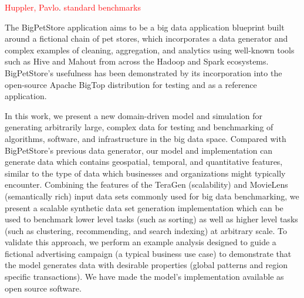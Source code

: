 \documentclass[conference]{IEEEtran}
\begin{document}
\textcolor{red}{Huppler, Pavlo}.  \textcolor{red}{standard benchmarks}

The BigPetStore application aims to be a big data application blueprint built around a fictional chain of pet stores, which incorporates a data generator and complex examples of cleaning, aggregation, and analytics using well-known tools such as Hive and Mahout \cite{Mahout} from across the Hadoop and Spark ecosystems. BigPetStore's usefulness has been demonstrated by its incorporation into the open-source Apache BigTop distribution \cite{BigTop} for testing and as a reference application.  

In this work, we present a new domain-driven model and simulation for generating arbitrarily large, complex data for testing and benchmarking of algorithms, software, and infrastructure in the big data space. Compared with BigPetStore's previous data generator, our model and implementation can generate data which contains geospatial, temporal, and quantitative features, similar to the type of data which businesses and organizations might typically encounter.  Combining the features of the TeraGen (scalability)  and MovieLens \cite{MovieLens} (semantically rich) input data sets commonly used for big data benchmarking, we present a scalable synthetic data set generation implementation which can be used to benchmark lower level tasks (such as sorting) as well as higher level tasks (such as clustering, recommending, and search indexing) at arbitrary scale.  To validate this approach, we perform an example analysis designed to guide a fictional advertising campaign (a typical business use case) to demonstrate that the model generates data with desirable properties (global patterns and region specific transactions).  We have made the model's implementation available as open source software.


\end{document}
